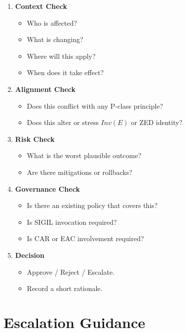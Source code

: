\begin{enumerate}
    \item \textbf{Context Check}  
          \begin{itemize}
              \item Who is affected?
              \item What is changing?
              \item Where will this apply?
              \item When does it take effect?
          \end{itemize}
    \item \textbf{Alignment Check}  
          \begin{itemize}
              \item Does this conflict with any P-class principle?
              \item Does this alter or stress $Inv(E)$ or ZED identity?
          \end{itemize}
    \item \textbf{Risk Check}  
          \begin{itemize}
              \item What is the worst plausible outcome?
              \item Are there mitigations or rollbacks?
          \end{itemize}
    \item \textbf{Governance Check}  
          \begin{itemize}
              \item Is there an existing policy that covers this?
              \item Is SIGIL invocation required?
              \item Is CAR or EAC involvement required?
          \end{itemize}
    \item \textbf{Decision}  
          \begin{itemize}
              \item Approve / Reject / Escalate.
              \item Record a short rationale.
          \end{itemize}
\end{enumerate}

\section{Escalation Guidance}

